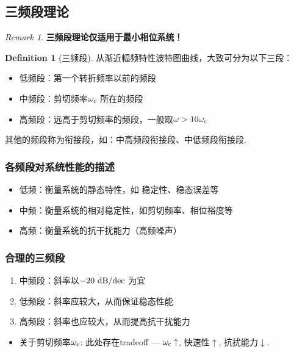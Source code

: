 \documentclass[14pt,a4paper]{article}
\theoremstyle{plain}
\theoremstyle{definition}
\newtheorem*{dfn}{Definition}
\theoremstyle{remark}
\newtheorem{rmk}{Remark}[section]
\theoremstyle{plain}
\theoremstyle{plain}
\theoremstyle{plain}
\theoremstyle{definition}
\theoremstyle{remark}
\numberwithin{equation}{section}
\begin{document}
		\subsection{三频段理论}%
		\label{sub:三频段理论}

			\begin{rmk}  
				\textbf{三频段理论仅适用于最小相位系统！} 
			\end{rmk} 
		
			\begin{dfn}[三频段]  
			\label{dfn:三频段}
				从渐近幅频特性波特图曲线，大致可分为以下三段：
				\begin{itemize}
					\item 低频段：第一个转折频率以前的频段
					\item 中频段：剪切频率$\omega_\textnormal{c}$ 所在的频段 
					\item 高频段：远高于剪切频率的频段，一般取$\omega > 10 \omega_\textnormal{c}$ 
				\end{itemize} 
				其他的频段称为衔接段，如：中高频段衔接段、中低频段衔接段. 
			\end{dfn} 

			\subsubsection*{各频段对系统性能的描述}%
		
				\begin{itemize}
					\item 低频：衡量系统的静态特性，如 稳定性、稳态误差等
					\item 中频：衡量系统的相对稳定性，如剪切频率、相位裕度等 
					\item 高频：衡量系统的抗干扰能力（高频噪声） 
				\end{itemize} 

			\subsubsection{合理的三频段}%
			\label{ssub:合理的三频段}
			
				\begin{enumerate}
					\item 中频段：斜率以$-20\textnormal{ dB/dec}$ 为宜 
					\item 低频段：斜率应较大，从而保证稳态性能 
					\item 高频段：斜率也应较大，从而提高抗干扰能力
				\end{enumerate}	
				\begin{itemize}
					\item 关于剪切频率$\omega_\textnormal{c}$: 此处存在tradeoff --- $\omega_\textnormal{c}\uparrow$, 快速性$\uparrow$, 抗扰能力$\downarrow$. 
				\end{itemize}
			
\end{document}
